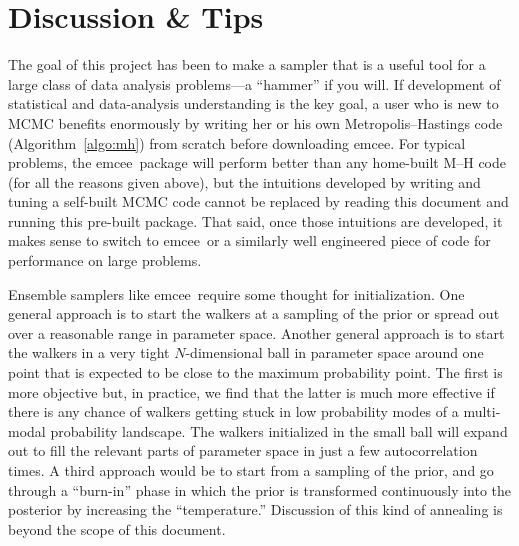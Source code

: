 \documentclass[12pt,preprint]{aastex}
\newcommand{\project}[1]{{\sffamily #1}}
\newcommand{\thisplain}{emcee}
\newcommand{\this}{\project{\thisplain}}
\newcommand{\sectlabel}[1]{\label{sect:#1}}
\newcommand{\Algo}[1]{Algorithm~\ref{algo:#1}}
\newcommand{\algo}[1]{\Algo{#1}}
\begin{document}
\section{Discussion \& Tips}\sectlabel{advice}

The goal of this project has been to make a sampler that is a useful
tool for a large class of data analysis problems---a ``hammer'' if you
will.  If development of statistical and data-analysis understanding
is the key goal, a user who is new to MCMC benefits enormously by
writing her or his own Metropolis--Hastings code (\algo{mh}) from
scratch before downloading \this.  For typical problems, the
\this\ package will perform better than any home-built M--H code (for
all the reasons given above), but the intuitions developed by writing
and tuning a self-built MCMC code cannot be replaced by reading this
document and running this pre-built package.  That said, once those
intuitions are developed, it makes sense to switch to \this\ or a
similarly well engineered piece of code for performance on large
problems.

Ensemble samplers like \this\ require some thought for initialization.
One general approach is to start the walkers at a sampling of the
prior or spread out over a reasonable range in parameter space.
Another general approach is to start the walkers in a very tight
$N$-dimensional ball in parameter space around one point that is
expected to be close to the maximum probability point.  The first is
more objective but, in practice, we find that the latter is much more
effective if there is any chance of walkers getting stuck in low
probability modes of a multi-modal probability landscape.  The walkers
initialized in the small ball will expand out to fill the relevant
parts of parameter space in just a few autocorrelation times.  A third
approach would be to start from a sampling of the prior, and go
through a ``burn-in'' phase in which the prior is transformed
continuously into the posterior by increasing the ``temperature.''
Discussion of this kind of annealing is beyond the scope of this
document.
\end{document}
